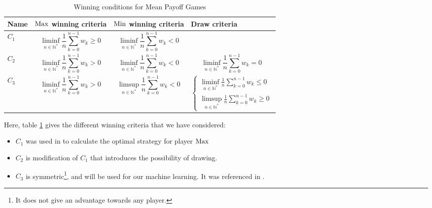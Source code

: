 \begin{table}[h]
	\small
	\begin{tabularx}{\textwidth}{| p{2cm} | X | X | X |}
		\hline
		
		Name & $\operatorname{Max}$ winning criteria & $\operatorname{Min}$ winning criteria & Draw criteria  \\
		\hline
		$C_1$ & \begin{equation*}
			\liminf_{n\in\mathbb{N}^*} \frac{1}{n}\sum_{k=0}^{n-1} w_k \ge 0
		\end{equation*} & \begin{equation*}
		\liminf_{n\in\mathbb{N}^*} \frac{1}{n}\sum_{k=0}^{n-1} w_k < 0
		\end{equation*} & \cellcolor{gray!75} \\
		\hline
		$C_2$ & \begin{equation*}
			\liminf_{n\in\mathbb{N}^*} \frac{1}{n}\sum_{k=0}^{n-1} w_k > 0
		\end{equation*} & \begin{equation*}
			\liminf_{n\in\mathbb{N}^*} \frac{1}{n}\sum_{k=0}^{n-1} w_k < 0
		\end{equation*} & \begin{equation*}
		\liminf_{n\in\mathbb{N}^*} \frac{1}{n}\sum_{k=0}^{n-1} w_k = 0
		\end{equation*} \\
		\hline
		 $C_3$ & \begin{equation*}
		 	\liminf_{n\in\mathbb{N}^*} \frac{1}{n}\sum_{k=0}^{n-1} w_k > 0
		 \end{equation*} & \begin{equation*}
		 	\limsup_{n\in\mathbb{N}^*} \frac{1}{n}\sum_{k=0}^{n-1} w_k < 0
		 \end{equation*} & \begin{equation*}
		 \begin{cases} 
		 	\displaystyle \liminf_{n\in\mathbb{N}^*} \frac{1}{n}\sum_{k=0}^{n-1} w_k \le 0 \\
		 	 \displaystyle \limsup_{n\in\mathbb{N}^*} \frac{1}{n}\sum_{k=0}^{n-1} w_k \ge 0
		 \end{cases}
		 \end{equation*}\\
		\hline
	\end{tabularx}
	\caption{Winning conditions for Mean Payoff Games
		\label{table:WinningConditions}}
\end{table}
Here, table \ref{table:WinningConditions} gives the different winning criteria that we have considered:
\begin{itemize}
	\item $C_1$ was used in \cite{MPGMaxAtom} to calculate the optimal strategy for player $\operatorname{Max}$
	\item $C_2$ is modification of $C_1$ that introduces the possibility of drawing.
	\item $C_3$ is symmetric\footnote{It does not give an advantage towards any player.}, and will be used for our machine learning. It was referenced in \cite{TropicalCSP}.
\end{itemize}

